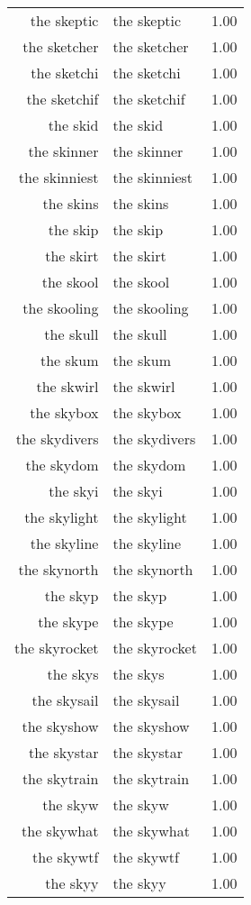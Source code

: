 \begin{table}[ht]
\begin{tabular}{rlr}
  the skeptic & the skeptic & 1.00 \\ 
  the sketcher & the sketcher & 1.00 \\ 
  the sketchi & the sketchi & 1.00 \\ 
  the sketchif & the sketchif & 1.00 \\ 
  the skid & the skid & 1.00 \\ 
  the skinner & the skinner & 1.00 \\ 
  the skinniest & the skinniest & 1.00 \\ 
  the skins & the skins & 1.00 \\ 
  the skip & the skip & 1.00 \\ 
  the skirt & the skirt & 1.00 \\ 
  the skool & the skool & 1.00 \\ 
  the skooling & the skooling & 1.00 \\ 
  the skull & the skull & 1.00 \\ 
  the skum & the skum & 1.00 \\ 
  the skwirl & the skwirl & 1.00 \\ 
  the skybox & the skybox & 1.00 \\ 
  the skydivers & the skydivers & 1.00 \\ 
  the skydom & the skydom & 1.00 \\ 
  the skyi & the skyi & 1.00 \\ 
  the skylight & the skylight & 1.00 \\ 
  the skyline & the skyline & 1.00 \\ 
  the skynorth & the skynorth & 1.00 \\ 
  the skyp & the skyp & 1.00 \\ 
  the skype & the skype & 1.00 \\ 
  the skyrocket & the skyrocket & 1.00 \\ 
  the skys & the skys & 1.00 \\ 
  the skysail & the skysail & 1.00 \\ 
  the skyshow & the skyshow & 1.00 \\ 
  the skystar & the skystar & 1.00 \\ 
  the skytrain & the skytrain & 1.00 \\ 
  the skyw & the skyw & 1.00 \\ 
  the skywhat & the skywhat & 1.00 \\ 
  the skywtf & the skywtf & 1.00 \\ 
  the skyy & the skyy & 1.00 \\ 

\end{tabular}
\end{table}
